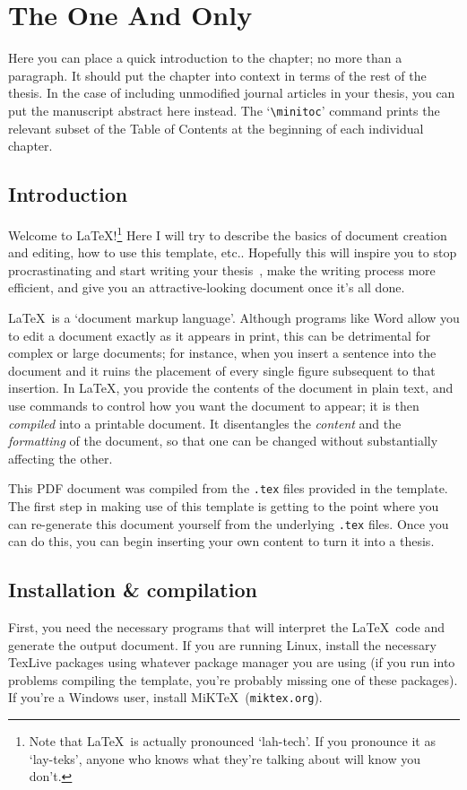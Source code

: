 %
\chapter{The One And Only}
\minitoc \onehalfspace%
Here you can place a quick introduction to the chapter; no more than a paragraph. It should put the chapter into context in terms of the rest of the thesis. In the case of including unmodified journal articles in your thesis, you can put the manuscript abstract here instead. The `\verb+\minitoc+' command prints the relevant subset of the Table of Contents at the beginning of each individual chapter.
%
%
%
\section{Introduction}
%
Welcome to \LaTeX!\footnote{Note that \LaTeX~is actually pronounced `lah-tech'. If you pronounce it as `lay-teks', anyone who knows what they're talking about will know you don't.} Here I will try to describe the basics of document creation and editing, how to use this template, etc.. Hopefully this will inspire you to stop procrastinating and start writing your thesis~\cite{upper1974}, make the writing process more efficient, and give you an attractive-looking document once it's all done.

\LaTeX~is a `document markup language'. Although programs like Word allow you to edit a document exactly as it appears in print, this can be detrimental for complex or large documents; for instance, when you insert a sentence into the document and it ruins the placement of every single figure subsequent to that insertion. In \LaTeX, you provide the contents of the document in plain text, and use commands to control how you want the document to appear; it is then {\em compiled} into a printable document. It disentangles the {\em content} and the {\em formatting} of the document, so that one can be changed without substantially affecting the other.

This PDF document was compiled from the \verb+.tex+ files provided in the template. The first step in making use of this template is getting to the point where you can re-generate this document yourself from the underlying \verb+.tex+ files. Once you can do this, you can begin inserting your own content to turn it into a thesis.
%
%
\section{Installation \& compilation}
%
First, you need the necessary programs that will interpret the \LaTeX~code and generate the output document. If you are running Linux, install the necessary TexLive packages using whatever package manager you are using (if you run into problems compiling the template, you're probably missing one of these packages). If you're a Windows user, install MiK\TeX~(\verb+miktex.org+).

